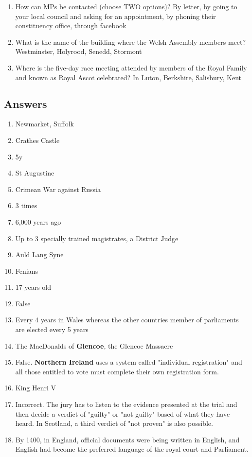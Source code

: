 \documentclass{amsart}
\begin{document}
\begin{enumerate}
	\item How can MPs be contacted (choose TWO options)? By letter, by going to your local council and asking for an appointment, by phoning their constituency office, through facebook      
	\item What is the name of the building where the Welsh Assembly members meet? Westminster, Holyrood, Senedd, Stormont
	\item Where is the five-day race meeting attended by members of the Royal Family and known as Royal Ascot celebrated? In Luton, Berkshire, Salisbury, Kent
\end{enumerate}
	
\subsection{Answers}
\begin{enumerate}
\item Newmarket, Suffolk
\item Crathes Castle
\item 5y
\item St Augustine
\item Crimean War against Russia
\item 3 times
\item 6,000 years ago
\item Up to 3 specially trained magistrates,
  a District Judge
 \item Auld Lang Syne
 \item Fenians
 \item 17 years old
 \item False
 \item Every 4 years in Wales whereas the other countries member of parliaments are elected every 5 years
 \item The MacDonalds of \textbf{Glencoe}, the Glencoe Massacre
 \item False. \textbf{Northern Ireland} uses a system called "individual registration" and all those entitled to vote must complete their own registration form.
 \item King Henri V
 \item Incorrect. The jury has to listen to the evidence presented at the trial and then decide a verdict of "guilty" or "not guilty" based of what they have heard. In Scotland, a third verdict of "not proven" is also possible.
 \item By 1400, in England, official documents were being written in English, and English had become the preferred language of the royal court and Parliament.

\end{enumerate}
\end{document}
